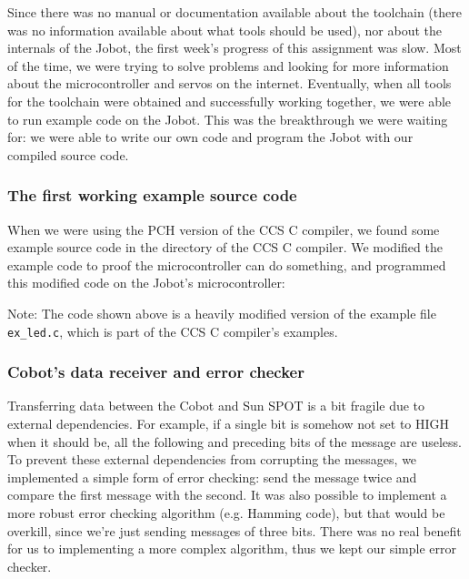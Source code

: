 \documentclass[a4paper,10pt]{article} %
\begin{document}
Since there was no manual or documentation available about the toolchain (there
was no information available about what tools should be used), nor about the
internals of the Jobot, the first week's progress of this assignment was slow.
Most of the time, we were trying to solve problems and looking for more
information about the microcontroller and servos on the internet.  Eventually,
when all tools for the toolchain were obtained and successfully working
together, we were able to run example code on the Jobot. This was the
breakthrough we were waiting for: we were able to write our own code and program
the Jobot with our compiled source code.

\subsubsection{The first working example source code} %
\label{ssub:The first working example source code}

When we were using the PCH version of the CCS C compiler, we found some example
source code in the directory of the CCS C compiler. We modified the example code
to proof the microcontroller can do something, and programmed this modified code
on the Jobot's microcontroller:



\noindent Note: The code shown above is a heavily modified version of the
example file \texttt{ex\_led.c}, which is part of the CCS C compiler's examples.


\subsubsection{Cobot's data receiver and error checker} %
\label{ssub:Cobot's data receiver and error checker}

Transferring data between the Cobot and Sun SPOT is a bit fragile due to
external dependencies. For example, if a single bit is somehow not set to HIGH
when it should be, all the following and preceding bits of the message are
useless. To prevent these external dependencies from corrupting the messages, we
implemented a simple form of error checking: send the message twice and compare
the first message with the second. It was also possible to implement a more
robust error checking algorithm (e.g. Hamming code), but that would be overkill,
since we're just sending messages of three bits. There was no real benefit for
us to implementing a more complex algorithm, thus we kept our simple error
checker.
\end{document}
